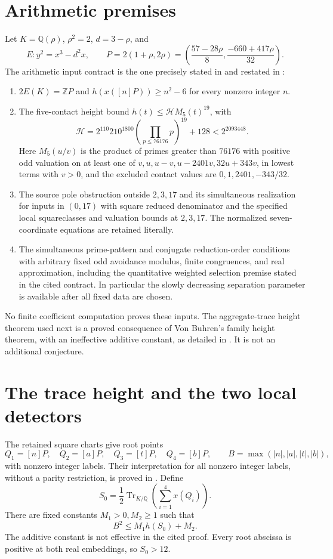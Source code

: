 \documentclass[11pt,a4paper]{article}
\theoremstyle{remark}\newtheorem{remark}[theorem]{Remark}
\newcommand{\Q}{\mathbb Q}\newcommand{\Z}{\mathbb Z}\newcommand{\HH}{\mathcal H}
\DeclareMathOperator{\Tr}{Tr}
\begin{document}
\section{Arithmetic premises}\label{sec:premises}
Let $K=\Q(\rho)$, $\rho^2=2$, $d=3-\rho$, and
\[
 E:y^2=x^3-d^2x,\qquad
 P=2(1+\rho,2\rho)
   =\left(\frac{57-28\rho}{8},\frac{-660+417\rho}{32}\right).
\]
The arithmetic input contract is the one precisely stated in
\cite[Section~2]{Source} and restated in \cite[Section~2]{Explicit}:
\begin{enumerate}
\item $2E(K)=\Z P$ and $h(x([n]P))\ge n^2-6$ for every nonzero
integer $n$.
\item The five-contact height bound $h(t)\le\HH M_5(t)^{19}$, with
\[
 \HH=2^{110}210^{1800}\left(\prod_{p\le76176}p\right)^{19}+128
       <2^{2093448}.
\]
Here $M_5(u/v)$ is the product of primes greater than $76176$ with
positive odd valuation on at least one of
$v,u,u-v,u-2401v,32u+343v$, in lowest terms with $v>0$, and the
excluded contact values are $0,1,2401,-343/32$.
\item The source pole obstruction outside $2,3,17$ and its simultaneous
realization for inputs in $(0,17)$ with square reduced denominator and
the specified local squareclasses and valuation bounds at $2,3,17$.
The normalized seven-coordinate equations are retained literally.
\item The simultaneous prime-pattern and conjugate reduction-order
conditions with arbitrary fixed odd avoidance modulus, finite congruences,
and real approximation, including the quantitative weighted selection
premise stated in the cited contract. In particular the slowly decreasing
separation parameter is available after all fixed data are chosen.
\end{enumerate}
No finite coefficient computation proves these inputs. The
aggregate-trace height theorem used next is a proved consequence of
Von Buhren's family height theorem, with an ineffective additive constant,
as detailed in \cite{Aggregate}. It is not an additional conjecture.

\section{The trace height and the two local detectors}
The retained square charts give root points
\[
 Q_1=[n]P,\quad Q_2=[a]P,\quad Q_3=[t]P,\quad Q_4=[b]P,
 \qquad B=\max(|n|,|a|,|t|,|b|),
\]
with nonzero integer labels. Their interpretation for all nonzero
integer labels, without a parity restriction, is proved in
\cite[Section~2]{Baseline}. Define
\[
 S_0=\frac12\Tr_{K/\Q}\left(\sum_{i=1}^4x(Q_i)\right).
\]
There are fixed constants $M_1>0,M_2\ge1$ such that
\begin{equation}\label{eq:traceheight}
                           B^2\le M_1h(S_0)+M_2.
\end{equation}
The additive constant is not effective in the cited proof. Every root
abscissa is positive at both real embeddings, so $S_0>12$.
\end{document}
